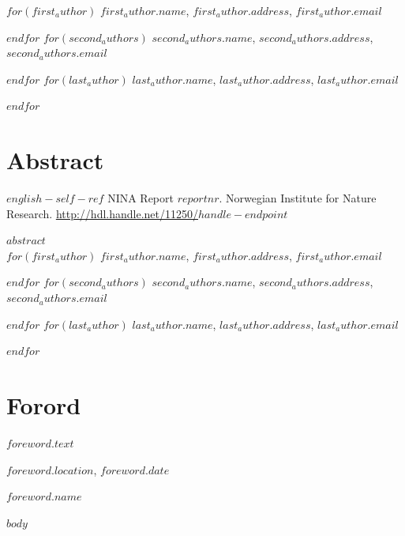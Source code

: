 \documentclass[11pt, a4paper]{article}
\renewcommand*{\href}[2]{\hyperref[#1]{\color{darkblue}\setulcolor{darkblue}\ul{\mbox{#2}}}}
\begin{document}
\vspace{1cm}
\small
$for(first_author)$
$first_author.name$, $first_author.address$, $first_author.email$  \par
$endfor$
$for(second_authors)$
$second_authors.name$, $second_authors.address$, $second_authors.email$  \par
$endfor$
$for(last_author)$
$last_author.name$, $last_author.address$, $last_author.email$  \par
$endfor$
\normalsize
\clearpage

\setcounter{secnumdepth}{0}
\section{Abstract}
\small{$english-self-ref$} NINA Report $reportnr$. Norwegian Institute for Nature Research. \href{http://hdl.handle.net/11250/$handle-endpoint$}{http://hdl.handle.net/11250/$handle-endpoint$}\par
\vspace{0.5cm}
\normalsize{
$abstract$} \\

\vspace{1cm}
\small
$for(first_author)$
$first_author.name$, $first_author.address$, $first_author.email$  \par
$endfor$
$for(second_authors)$
$second_authors.name$, $second_authors.address$, $second_authors.email$  \par
$endfor$
$for(last_author)$
$last_author.name$, $last_author.address$, $last_author.email$  \par
$endfor$
\normalsize
\clearpage


\doublespacing
\tableofcontents
{}
\singlespacing
\clearpage

\section{Forord}

\normalsize
$foreword.text$\par
\medskip
$foreword.location$, $foreword.date$\par
\medskip
$foreword.name$



\clearpage
\setcounter{secnumdepth}{4}
\setlength{\parskip}{6pt}

$body$


\end{document}
